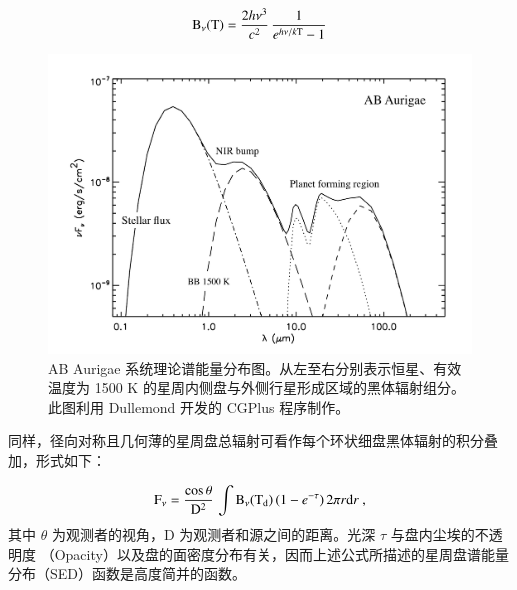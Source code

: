 \begin{equation} \label{eq:blackbody}
\mathrm{B}_\nu (\mathrm{T}) = \frac{2h\nu^3}{c^2} \, \frac{1}{e^{h\nu / k\mathrm{T}}-1}
\end{equation} 

\begin{figure}[t!]
\centering
\includegraphics[width=1.0\textwidth]{figures/chapter3/f3_youngdisc.pdf}
\caption[AB Aurigae 系统理论谱能量分布图。从左至右分别表示恒星、有效温度为 1500 K 的星周内侧盘与外侧行星形成区域的黑体辐射组分。该图利用 Dullemond 开发的 CGPlus 程序制作。]{AB Aurigae 系统理论谱能量分布图。从左至右分别表示恒星、有效温度为 1500 K 的星周内侧盘与外侧行星形成区域的黑体辐射组分。此图利用 Dullemond 开发的 CGPlus 程序\footnotemark[1]制作。}
\label{fig:transdiscsed}
\end{figure}

同样，径向对称且几何薄的星周盘总辐射可看作每个环状细盘黑体辐射的积分叠加，形式如下：

\begin{equation} \label{eq:diskrad}
\mathrm{F}_\nu = \frac{\cos \theta}{\mathrm{D}^2} \, \int \mathrm{B}_\nu (\mathrm{T}_\mathrm{d}) \, ( 1-e^{-\tau} ) \, 2\pi r \mathrm{d} r \ ,  
\end{equation} 
其中 $\theta$ 为观测者的视角，D 为观测者和源之间的距离。光深 $\tau$ 与盘内尘埃的不透明度
（Opacity）以及盘的面密度分布有关，因而上述公式所描述的星周盘谱能量分布（SED）函数是高度简并的函数。



